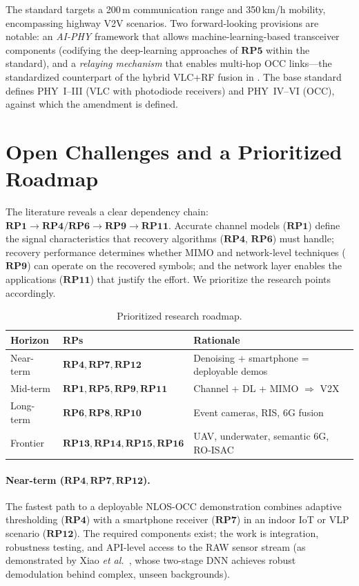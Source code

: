 \documentclass[10pt,a4paper]{article}
\newcommand{\rp}[1]{\textbf{RP#1}}
\begin{document}
The standard targets a 200\,m communication range and 350\,km/h mobility,
encompassing highway V2V scenarios. Two forward-looking provisions are
notable: an \emph{AI-PHY} framework that allows machine-learning-based
transceiver components (codifying the deep-learning approaches of
$\rp{5}$ within the standard), and a \emph{relaying mechanism} that
enables multi-hop OCC links---the standardized counterpart of the
hybrid VLC+RF fusion in \cite{okasha2022hybrid}. The base
standard~\cite{ieee8021572018} defines PHY~I--III (VLC with
photodiode receivers) and PHY~IV--VI (OCC), against which the amendment
is defined.

\section{Open Challenges and a Prioritized Roadmap}
\label{sec:roadmap}

The literature reveals a clear dependency chain:
$\rp{1}\rightarrow\rp{4}/\rp{6}\rightarrow\rp{9}\rightarrow\rp{11}$.
Accurate channel models ($\rp{1}$) define the signal characteristics
that recovery algorithms ($\rp{4}$, $\rp{6}$) must handle; recovery
performance determines whether MIMO and network-level techniques
($\rp{9}$) can operate on the recovered symbols; and the network layer
enables the applications ($\rp{11}$) that justify the effort. We
prioritize the research points accordingly.

\begin{table}[t]
\centering
\caption{Prioritized research roadmap.}
\label{tab:roadmap}
\small
\begin{tabular}{l l l}
\toprule
\textbf{Horizon} & \textbf{RPs} & \textbf{Rationale} \\
\midrule
Near-term & $\rp{4},\rp{7},\rp{12}$ & Denoising + smartphone = deployable demos \\
Mid-term  & $\rp{1},\rp{5},\rp{9},\rp{11}$ & Channel + DL + MIMO $\Rightarrow$ V2X \\
Long-term & $\rp{6},\rp{8},\rp{10}$ & Event cameras, RIS, 6G fusion \\
Frontier  & $\rp{13},\rp{14},\rp{15},\rp{16}$ & UAV, underwater, semantic 6G, RO-ISAC \\
\bottomrule
\end{tabular}
\end{table}

\paragraph{Near-term ($\rp{4}, \rp{7}, \rp{12}$).}
The fastest path to a deployable NLOS-OCC demonstration combines
adaptive thresholding ($\rp{4}$) with a smartphone receiver ($\rp{7}$)
in an indoor IoT or VLP scenario ($\rp{12}$). The required components
exist; the work is integration, robustness testing, and API-level
access to the RAW sensor stream (as demonstrated by
Xiao \emph{et al.}~\cite{winklink2024}, whose two-stage DNN achieves
robust demodulation behind complex, unseen backgrounds).
\end{document}
